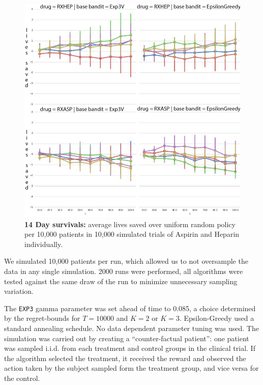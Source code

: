 \begin{figure}
\begin{center}
\includegraphics[width=1\columnwidth]{bandit/figs/fig1b.jpg}
\caption{\textbf{14 Day survivals:} average lives saved over uniform random policy per 10,000 patients in 10,000 simulated trials of Aspirin and Heparin individually.}
\label{fig1b}
\end{center}
\end{figure} 


We simulated 10,000 patients per run, which allowed us to not oversample the data in any single simulation. 2000 runs were performed, all algorithms were tested against the same draw of the run to minimize unnecessary sampling variation. 

The \texttt{EXP3} gamma parameter was set ahead of time to 0.085, a choice determined by the regret-bounds for $T=10000$ and $K=2$ or $K=3$. Epsilon-Greedy used a standard annealing schedule. No data dependent parameter tuning was used.
The simulation was carried out by creating a ``counter-factual patient'': one patient was sampled i.i.d. from each treatment and control groups in the clinical trial. If the algorithm selected the treatment, it received the reward and observed the action taken by the subject sampled form the treatment group, and vice versa for the control.



